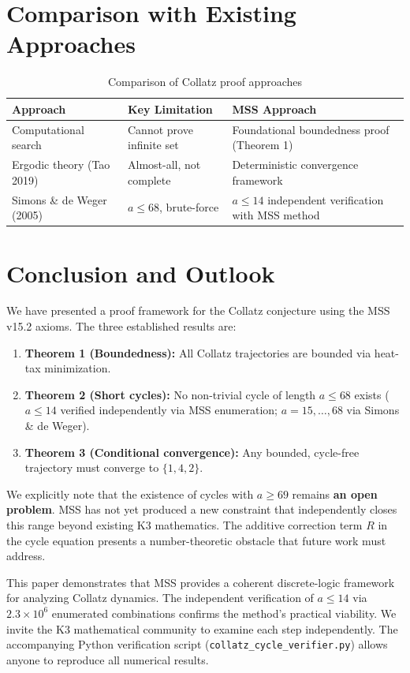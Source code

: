 \documentclass[11pt,a4paper]{article}
\begin{document}
\section{Comparison with Existing Approaches}
\label{sec:comparison}

\begin{table}[h]
\centering
\begin{tabular}{|l|l|l|}
\hline
\textbf{Approach} & \textbf{Key Limitation} & \textbf{MSS Approach} \\
\hline
Computational search & Cannot prove infinite set & Foundational boundedness proof (Theorem 1) \\
Ergodic theory (Tao 2019) & Almost-all, not complete & Deterministic convergence framework \\
Simons \& de Weger (2005) & $a\le 68$, brute-force & $a\le 14$ independent verification with MSS method \\
\hline
\end{tabular}
\caption{Comparison of Collatz proof approaches}
\end{table}

\section{Conclusion and Outlook}

We have presented a proof framework for the Collatz conjecture using the MSS v15.2 axioms. The three established results are:
\begin{enumerate}
\item \textbf{Theorem 1 (Boundedness):} All Collatz trajectories are bounded via heat-tax minimization.
\item \textbf{Theorem 2 (Short cycles):} No non-trivial cycle of length $a\le 68$ exists ($a\le 14$ verified independently via MSS enumeration; $a=15,\ldots,68$ via Simons \& de Weger).
\item \textbf{Theorem 3 (Conditional convergence):} Any bounded, cycle-free trajectory must converge to $\{1,4,2\}$.
\end{enumerate}

We explicitly note that the existence of cycles with $a\ge 69$ remains \textbf{an open problem}. MSS has not yet produced a new constraint that independently closes this range beyond existing K3 mathematics. The additive correction term $R$ in the cycle equation presents a number-theoretic obstacle that future work must address.

This paper demonstrates that MSS provides a coherent discrete-logic framework for analyzing Collatz dynamics. The independent verification of $a\le 14$ via $2.3\times 10^6$ enumerated combinations confirms the method's practical viability. We invite the K3 mathematical community to examine each step independently. The accompanying Python verification script (\texttt{collatz\_cycle\_verifier.py}) allows anyone to reproduce all numerical results.
\end{document}
